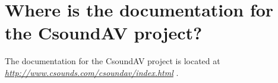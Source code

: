 \begin{comment}
\documentclass[10pt]{article}
\usepackage{fullpage, graphicx, url}
\setlength{\parskip}{1ex}
\setlength{\parindent}{0ex}
\title{Where is the documentation for the CsoundAV project?}



\begin{tabular}{ccc}
The Alternative Csound Reference Manual & & \\
Previous &Preface &Next

\end{tabular}

\end{comment}
\section{Where is the documentation for the CsoundAV project?}


  The documentation for the CsoundAV project is located at \emph{\url{http://www.csounds.com/csoundav/index.html}}
. 


\begin{comment}
\begin{tabular}{lcr}
Previous &Home &Next \\
What is the scope of the Alternative Csound Reference Manual? &Up &Overview

\end{tabular}



\end{comment}
